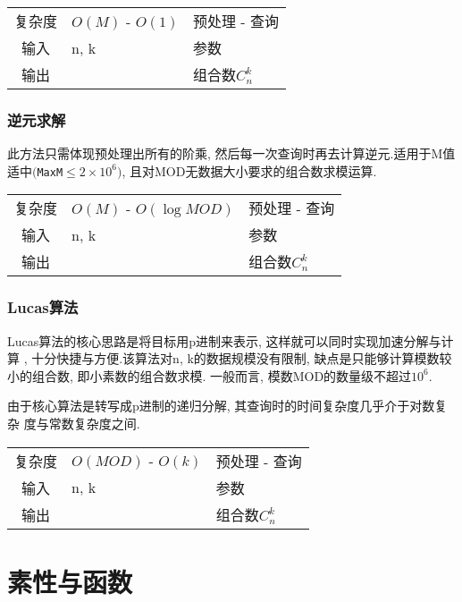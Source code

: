 \begin{longtable}{|c|l|l|}
复杂度 & $O(M)$ - $O(1)$ & 预处理 - 查询 \\
输入 & n, k & 参数 \\
输出 &  & 组合数$C^{k}_{n}$ \\
\end{longtable}



        \subsubsection{逆元求解}\small
此方法只需体现预处理出所有的阶乘, 然后每一次查询时再去计算逆元.适用于M值
适中$(${\tt MaxM}$ \leq 2 \times 10^6)$, 且对MOD无数据大小要求的组合数求模运算.

\begin{longtable}{|c|l|l|}
复杂度 & $O(M)$ - $O(\log MOD)$ & 预处理 - 查询 \\
输入 & n, k & 参数 \\
输出 &  & 组合数$C^{k}_{n}$ \\
\end{longtable}



        \subsubsection{Lucas算法}\small
Lucas算法的核心思路是将目标用p进制来表示, 这样就可以同时实现加速分解与计算
, 十分快捷与方便.该算法对n, k的数据规模没有限制, 缺点是只能够计算模数较小的组合数, 即小素数的组合数求模.
一般而言, 模数MOD的数量级不超过$10^6$.

由于核心算法是转写成p进制的递归分解, 其查询时的时间复杂度几乎介于对数复杂
度与常数复杂度之间.

\begin{longtable}{|c|l|l|}
复杂度 & $O(MOD)$ - $O(k)$ & 预处理 - 查询 \\
输入 & n, k & 参数 \\
输出 &  & 组合数$C^{k}_{n}$ \\
\end{longtable}






\section{素性与函数}


